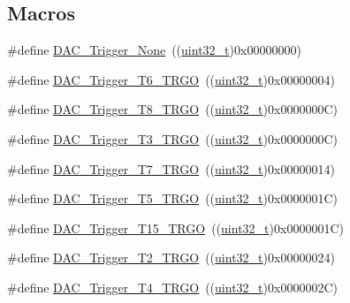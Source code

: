 \subsection*{Macros}
\begin{DoxyCompactItemize}
\item 
\#define \hyperlink{group___d_a_c__trigger__selection_ga7849138e043267668d755390d923e4ba}{D\+A\+C\+\_\+\+Trigger\+\_\+\+None}~((\hyperlink{_p_e___types_8h_a33594304e786b158f3fb30289278f5af}{uint32\+\_\+t})0x00000000)
\item 
\#define \hyperlink{group___d_a_c__trigger__selection_ga083307783678a2f1d3066db57dc84cfe}{D\+A\+C\+\_\+\+Trigger\+\_\+\+T6\+\_\+\+T\+R\+GO}~((\hyperlink{_p_e___types_8h_a33594304e786b158f3fb30289278f5af}{uint32\+\_\+t})0x00000004)
\item 
\#define \hyperlink{group___d_a_c__trigger__selection_ga756700c6621eadb807e21a16966580a0}{D\+A\+C\+\_\+\+Trigger\+\_\+\+T8\+\_\+\+T\+R\+GO}~((\hyperlink{_p_e___types_8h_a33594304e786b158f3fb30289278f5af}{uint32\+\_\+t})0x0000000\+C)
\item 
\#define \hyperlink{group___d_a_c__trigger__selection_ga82cbaedc35164c8b9fe0be2faec9b909}{D\+A\+C\+\_\+\+Trigger\+\_\+\+T3\+\_\+\+T\+R\+GO}~((\hyperlink{_p_e___types_8h_a33594304e786b158f3fb30289278f5af}{uint32\+\_\+t})0x0000000\+C)
\item 
\#define \hyperlink{group___d_a_c__trigger__selection_ga9b92d497746be54af46ae4e9c1fc4a6f}{D\+A\+C\+\_\+\+Trigger\+\_\+\+T7\+\_\+\+T\+R\+GO}~((\hyperlink{_p_e___types_8h_a33594304e786b158f3fb30289278f5af}{uint32\+\_\+t})0x00000014)
\item 
\#define \hyperlink{group___d_a_c__trigger__selection_ga35352cebfd1ae8a3d63e374a5d86a85d}{D\+A\+C\+\_\+\+Trigger\+\_\+\+T5\+\_\+\+T\+R\+GO}~((\hyperlink{_p_e___types_8h_a33594304e786b158f3fb30289278f5af}{uint32\+\_\+t})0x0000001\+C)
\item 
\#define \hyperlink{group___d_a_c__trigger__selection_ga9f738c0c1366a588ac4fa9e060278c70}{D\+A\+C\+\_\+\+Trigger\+\_\+\+T15\+\_\+\+T\+R\+GO}~((\hyperlink{_p_e___types_8h_a33594304e786b158f3fb30289278f5af}{uint32\+\_\+t})0x0000001\+C)
\item 
\#define \hyperlink{group___d_a_c__trigger__selection_ga3bfbff1e03af1fd17a57a43e57420fe6}{D\+A\+C\+\_\+\+Trigger\+\_\+\+T2\+\_\+\+T\+R\+GO}~((\hyperlink{_p_e___types_8h_a33594304e786b158f3fb30289278f5af}{uint32\+\_\+t})0x00000024)
\item 
\#define \hyperlink{group___d_a_c__trigger__selection_ga58ccb2de3d22d66ee975152f5edb330a}{D\+A\+C\+\_\+\+Trigger\+\_\+\+T4\+\_\+\+T\+R\+GO}~((\hyperlink{_p_e___types_8h_a33594304e786b158f3fb30289278f5af}{uint32\+\_\+t})0x0000002\+C)

\end{DoxyCompactItemize}
